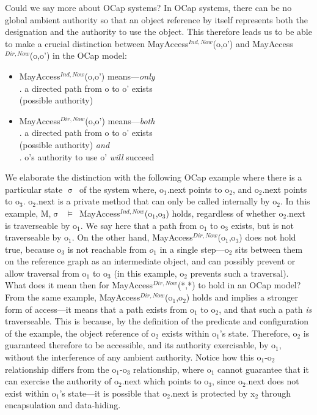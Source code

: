\documentclass[a4paper,11pt, twoside,twocolumn]{article}
\newcommand{\losigma}{$\upsigma$}
\newcommand{\loturns} {$\vDash$}
\newcommand{\ablock} {\null\qquad}
\begin{document}
Could we say more about OCap systems? In OCap systems, there can be no global ambient authority so that an object reference by itself represents both the designation and the authority to use the object. This therefore leads us to be able to make a crucial distinction between MayAccess$^{Ind,Now}$(o,o') and MayAccess$^{Dir,Now}$(o,o') in the OCap model:
\begin{itemize}
\item MayAccess$^{Ind,Now}$(o,o') means---\textit{only}\\
\ablock 1. a directed path from o to o' exists\\
\ablock\ablock (possible authority)
\item MayAccess$^{Dir,Now}$(o,o') means---\textit{both}\\
\ablock 1. a directed path from o to o' exists\\
\ablock\ablock (possible authority) \textit{and}\\
\ablock 2. o's authority to use o' \textit{will} succeed
\end{itemize}
We elaborate the distinction with the following OCap example where there is a particular state \losigma\ of the system where, o$_1$.next points to o$_2$, and o$_2$.next points to o$_3$. o$_2$.next is a private method that can only be called internally by o$_2$. In this example, M,\losigma ~\loturns ~MayAccess$^{Ind,Now}$(o$_1$,o$_3$) holds, regardless of whether o$_2$.next is traverseable by o$_1$. We say here that a path from o$_1$ to o$_3$ exists, but is not traverseable by o$_1$. On the other hand, MayAccess$^{Dir,Now}$(o$_1$,o$_3$) does not hold true, because o$_3$ is not reachable from $o_1$ in a single step---o$_2$ sits between them on the reference graph as an intermediate object, and can possibly prevent or allow traversal from o$_1$ to o$_3$ (in this example, o$_2$ prevents such a traversal).\\

What does it mean then for MayAccess$^{Dir,Now}$(*,*) to hold in an OCap model? From the same example, MayAccess$^{Dir,Now}$(o$_1$,o$_2$) holds and implies a stronger form of access---it means that a path exists from o$_1$ to o$_2$, and that such a path \textit{is} traverseable. This is because, by the definition of the predicate and configuration of the example, the object reference of o$_2$ exists within o$_1$'s state. Therefore, o$_2$ is guaranteed therefore to be accessible, and its authority exercisable, by o$_1$, without the interference of any ambient authority. Notice how this o$_1$-o$_2$ relationship differs from the o$_1$-o$_3$ relationship, where o$_1$ cannot guarantee that it can exercise the authority of o$_2$.next which points to o$_3$, since o$_2$.next does not exist within o$_1$'s state---it is possible that o$_2$.next is protected by x$_2$ through encapsulation and data-hiding.\\
\end{document}
